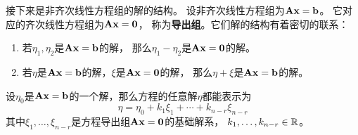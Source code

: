 接下来是非齐次线性方程组的解的结构。
设非齐次线性方程组为$\mathbf{A}\mathbf{x}=\mathbf{b}$。
它对应的齐次线性方程组为$\mathbf{A}\mathbf{x}=\mathbf{0}$，
称为\textbf{导出组}。它们解的结构有着密切的联系：
\begin{enumerate}
  \item
  若$\eta_1,\eta_2$是$\mathbf{A}\mathbf{x}=\mathbf{b}$的解，
  那么$\eta_1-\eta_2$是$\mathbf{A}\mathbf{x}=\mathbf{0}$的解。
  \item
  若$\eta$是$\mathbf{A}\mathbf{x}=\mathbf{b}$的解，$\xi$是$\mathbf{A}\mathbf{x}=\mathbf{0}$的解，
  那么$\eta+\xi$是$\mathbf{A}\mathbf{x}=\mathbf{b}$的解。
\end{enumerate}

\begin{theorem}[非齐次线性方程组的通解]
  设$\eta_0$是$\mathbf{A}\mathbf{x}=\mathbf{b}$的一个解，那么方程的任意解$\eta$都能表示为
  \[ \eta = \eta_0 + k_1\xi_1 + \cdots + k_{n-r}\xi_{n-r} \]
  其中$\xi_1,\dots,\xi_{n-r}$是方程导出组$\mathbf{A}\mathbf{x}=\mathbf{0}$的基础解系，
  $k_1,\dots,k_{n-r} \in \mathbb{R}$。
\end{theorem}
